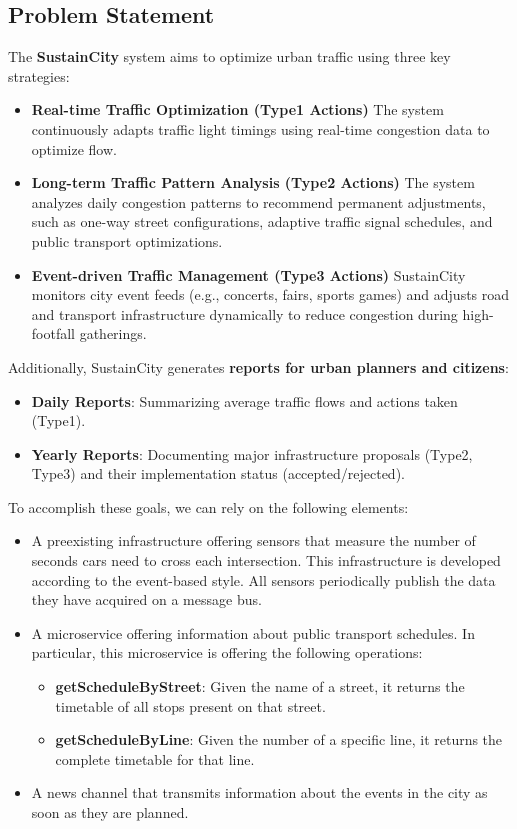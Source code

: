 \documentclass[a4paper,12pt]{article}
\begin{document}
\subsection*{Problem Statement}
The \textbf{SustainCity} system aims to optimize urban traffic using three key strategies:
\begin{itemize}
    \item \textbf{Real-time Traffic Optimization (Type1 Actions)} 
    The system continuously adapts traffic light timings using real-time congestion data to optimize flow.  
    \item \textbf{Long-term Traffic Pattern Analysis (Type2 Actions)}  
    The system analyzes daily congestion patterns to recommend permanent adjustments, such as one-way street configurations, adaptive traffic signal schedules, and public transport optimizations.
    \item \textbf{Event-driven Traffic Management (Type3 Actions)}
    SustainCity monitors city event feeds (e.g., concerts, fairs, sports games) and adjusts road and transport infrastructure dynamically to reduce congestion during high-footfall gatherings.
\end{itemize}

\noindent Additionally, SustainCity generates \textbf{reports for urban planners and citizens}:
\begin{itemize}
    \item \textbf{Daily Reports}: Summarizing average traffic flows and actions taken (Type1).
    \item \textbf{Yearly Reports}: Documenting major infrastructure proposals (Type2, Type3) and their implementation status (accepted/rejected).
\end{itemize}

\noindent To accomplish these goals, we can rely on the following elements: 
\begin{itemize}
    \item A preexisting infrastructure offering sensors that measure the number of seconds cars need to cross each intersection. This infrastructure is developed according to the event-based style. All sensors periodically publish the data they have acquired on a message bus. 
    \item A microservice offering information about public transport schedules. In particular, this microservice is offering the following operations: 
    \begin{itemize} 
        \item \textbf{getScheduleByStreet}: Given the name of a street, it returns the timetable of all stops present on that street. 
        \item \textbf{getScheduleByLine}: Given the number of a specific line, it returns the complete timetable for that line.   
    \end{itemize}
    \item A news channel that transmits information about the events in the city as soon as they are planned.
\end{itemize}
\end{document}
